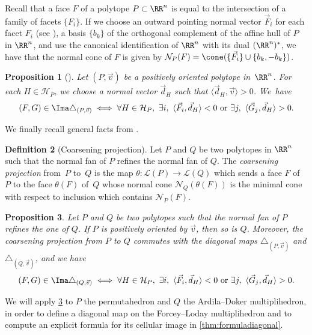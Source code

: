 \documentclass[JEP,XML,SOM,NoFloatCountersInSection,Unicode,published]{cedram}
\theoremstyle{definition}
\newtheorem{definition}{Definition}[section]
\theoremstyle{plain}
\newtheorem{proposition}[definition]{Proposition}
\begin{document}
Recall that a face $F$ of a polytope $P \subset \RR^n$ is equal to the intersection of a family of facets $\{F_i\}$.
If we choose an outward pointing normal vector $\vec F_i$ for each facet $F_i$ (see \cite[Def.\,1.25]{LA21}), a basis $\{b_k\}$ of the orthogonal complement of the affine hull of $P$ in $\RR^n$, and use the canonical identification of $\RR^n$ with its dual $(\RR^n)^{*}$, we have that the normal cone of $F$ is given by $\mathcal{N}_P(F)=\cone(\{\vec F_i\} \cup \{b_k,-b_k\})$.

\begin{proposition}[{\cite[Th.\,1.26]{LA21}}]
\label{thm:universalformula}
Let $(P,\vec v)$ be a positively oriented polytope in~$\RR^n$. For each $H\in\mathcal{H}_P$, we choose a normal vector $\vec d_H$ such that $\langle \vec d_H, \vec v \rangle >0$. We~have
\[
(F,G) \in \Ima \triangle_{(P,\vec v)}
\iff \forall H \in \mathcal{H}_P, \ \exists i, \ \langle \vec F_i, \vec d_H \rangle < 0 \text{ or } \exists j, \ \langle \vec G_j, \vec d_H \rangle > 0.
\]
\end{proposition}

We finally recall general facts from \cite[\S 1.6]{LA21}.

\begin{definition}[Coarsening projection]
\label{def:coarseningprojection}
Let $P$ and $Q$ be two polytopes in $\RR^n$ such that the normal fan of $P$ refines the normal fan of $Q$.
The \emph{coarsening projection} from~$P$ to~$Q$ is the map $\theta : \mathcal{L}(P)\to\mathcal{L}(Q)$ which sends a face $F$ of $P$ to the face $\theta(F)$ of~$Q$ whose normal cone $\mathcal{N}_Q(\theta(F))$ is the minimal cone with respect to inclusion which contains $\mathcal{N}_P(F)$.
\end{definition}

\begin{proposition}
\label{prop:refinementofnormalfans}
Let $P$ and $Q$ be two polytopes such that the normal fan of $P$ refines the one of $Q$.
If $P$ is positively oriented by $\vec v$, then so is $Q$.
Moreover, the coarsening projection from $P$ to $Q$ commutes with the diagonal maps $\triangle_{(P,\vec v)}$ and $\triangle_{(Q,\vec v)}$, and we have
\[
(F,G) \in \Ima \triangle_{(Q,\vec v)}
\iff \forall H \in \mathcal{H}_P, \ \exists i, \ \langle \vec F_i, \vec d_H \rangle < 0 \text{ or } \exists j, \ \langle \vec G_j, \vec d_H \rangle > 0.
\]
\end{proposition}

We will apply \cref{prop:refinementofnormalfans} to $P$ the permutahedron and $Q$ the Ardila--Doker multiplihedron, in order to define a diagonal map on the Forcey--Loday multiplihedron and to compute an explicit formula for its cellular image in \cref{thm:formuladiagonal}.
\end{document}
